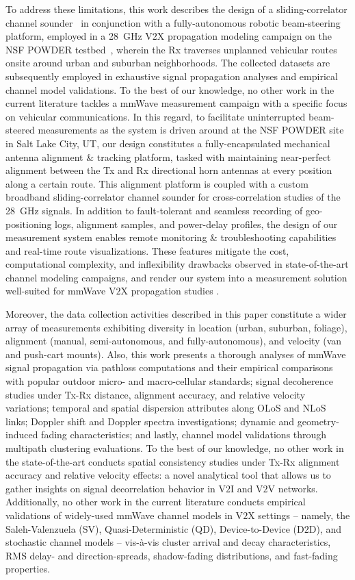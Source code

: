 \documentclass[12pt, draftcls, onecolumn]{IEEEtran}
\begin{document}
To address these limitations, this work describes the design of a sliding-correlator channel sounder~\cite{Sounder} in conjunction with a fully-autonomous robotic beam-steering platform, employed in a \SI{28}{\giga\hertz} V$2$X propagation modeling campaign on the NSF POWDER testbed~\cite{POWDER, POWDER_RF}, wherein the Rx traverses unplanned vehicular routes onsite around urban and suburban neighborhoods. The collected datasets are subsequently employed in exhaustive signal propagation analyses and empirical channel model validations. To the best of our knowledge, no other work in the current literature tackles a mmWave measurement campaign with a specific focus on vehicular communications. In this regard, to facilitate uninterrupted beam-steered measurements as the system is driven around at the NSF POWDER site in Salt Lake City, UT, our design constitutes a fully-encapsulated mechanical antenna alignment \& tracking platform, tasked with maintaining near-perfect alignment between the Tx and Rx directional horn antennas at every position along a certain route. This alignment platform is coupled with a custom broadband sliding-correlator channel sounder for cross-correlation studies of the \SI{28}{\giga\hertz} signals. In addition to fault-tolerant and seamless recording of geo-positioning logs, alignment samples, and power-delay profiles, the design of our measurement system enables remote monitoring \& troubleshooting capabilities and real-time route visualizations. These features mitigate the cost, computational complexity, and inflexibility drawbacks observed in state-of-the-art channel modeling campaigns, and render our system into a measurement solution well-suited for mmWave V$2$X propagation studies \cite{ICC}.

Moreover, the data collection activities described in this paper constitute a wider array of measurements exhibiting diversity in location (urban, suburban, foliage), alignment (manual, semi-autonomous, and fully-autonomous), and velocity (van and push-cart mounts). Also, this work presents a thorough analyses of mmWave signal propagation via pathloss computations and their empirical comparisons with popular outdoor micro- and macro-cellular standards; signal decoherence studies under Tx-Rx distance, alignment accuracy, and relative velocity variations; temporal and spatial dispersion attributes along OLoS and NLoS links; Doppler shift and Doppler spectra investigations; dynamic and geometry-induced fading characteristics; and lastly, channel model validations through multipath clustering evaluations. To the best of our knowledge, no other work in the state-of-the-art conducts spatial consistency studies under Tx-Rx alignment accuracy and relative velocity effects: a novel analytical tool that allows us to gather insights on signal decorrelation behavior in V$2$I and V$2$V networks. Additionally, no other work in the current literature conducts empirical validations of widely-used mmWave channel models in V$2$X settings -- namely, the Saleh-Valenzuela (SV), Quasi-Deterministic (QD), Device-to-Device (D$2$D), and stochastic channel models -- vis-\`{a}-vis cluster arrival and decay characteristics, RMS delay- and direction-spreads, shadow-fading distributions, and fast-fading properties.
\end{document}
